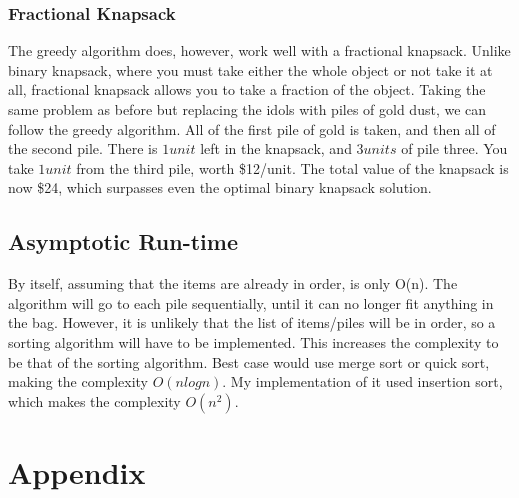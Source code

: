 \documentclass[letterpaper, 10pt,DIV=13]{scrartcl}
\numberwithin{equation}{section} %
\numberwithin{figure}{section} %
\numberwithin{table}{section} %
\begin{document}
\subsubsection{Fractional Knapsack}
The greedy algorithm does, however, work well with a fractional knapsack. Unlike binary knapsack, where you must take either the whole object or not take it at all, fractional knapsack allows you to take a fraction of the object. Taking the same problem as before but replacing the idols with piles of gold dust, we can follow the greedy algorithm. All of the first pile of gold is taken, and then all of the second pile. There is $1 unit$ left in the knapsack, and $3 units$ of pile three. You take $1 unit$ from the third pile, worth \$12/unit. The total value of the knapsack is now \$24, which surpasses even the optimal binary knapsack solution.

\subsection{Asymptotic Run-time}
By itself, assuming that the items are already in order, is only O(n). The algorithm will go to each pile sequentially, until it can no longer fit anything in the bag. However, it is unlikely that the list of items/piles will be in order, so a sorting algorithm will have to be implemented. This increases the complexity to be that of the sorting algorithm. Best case would use merge sort or quick sort, making the complexity $O(nlogn)$. My implementation of it used insertion sort, which makes the complexity $O(n^2)$.
\pagebreak


\section{Appendix}
\end{document}

